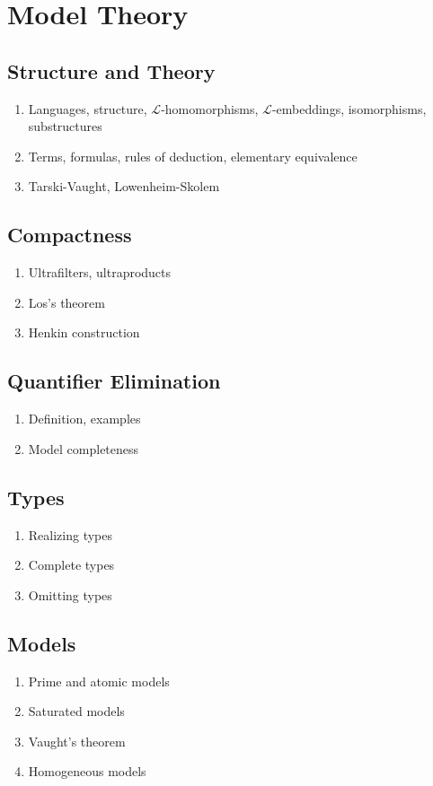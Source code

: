 \section{Model Theory}
\subsection{Structure and Theory} 
\begin{enumerate}
  \item Languages, structure, $\mathcal{L}$-homomorphisms,
    $\mathcal{L}$-embeddings, isomorphisms, substructures
  \item Terms, formulas, rules of deduction, elementary equivalence
  \item Tarski-Vaught, Lowenheim-Skolem
\end{enumerate}

\subsection{Compactness} 
\begin{enumerate}
  \item Ultrafilters, ultraproducts
  \item Los's theorem
  \item Henkin construction
\end{enumerate}

\subsection{Quantifier Elimination} 
\begin{enumerate}
  \item Definition, examples
  \item Model completeness
\end{enumerate}

\subsection{Types} 
\begin{enumerate}
  \item Realizing types
  \item Complete types
  \item Omitting types
\end{enumerate}

\subsection{Models} 
\begin{enumerate}
  \item Prime and atomic models
  \item Saturated models
  \item Vaught's theorem
  \item Homogeneous models
\end{enumerate}
